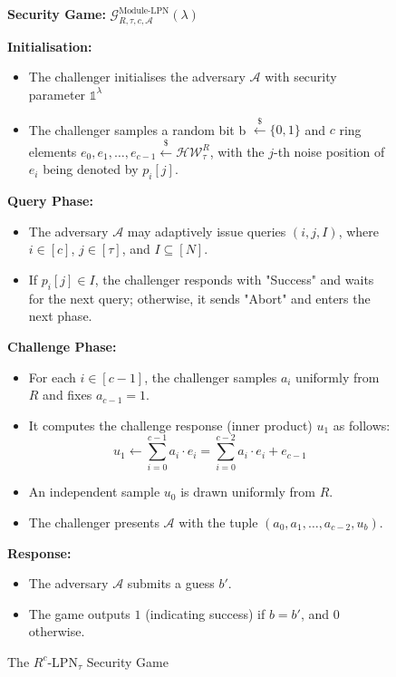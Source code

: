 \begin{figure}[t]
    \begin{mdframed}[]
        \begin{center}
            \textbf{Security Game:} $\mathcal{G}_{R, \tau, c,\mathcal{A}}^{\text{Module-LPN}}(\lambda)$\\
        \end{center}

        \textbf{Initialisation:}
        \begin{itemize}
            \item The challenger initialises the adversary $\mathcal{A}$ with security parameter $\mathds{1}^{\lambda}$
            \item The challenger samples a random bit b $\stackrel{\$}{\leftarrow} \{0,1\}$ and $c$ ring elements $e_{0}, e_{1}, \ldots, e_{c-1} \stackrel{\$}{\leftarrow} \mathcal{H} \mathcal{W}_{\tau}^{R}$, with the $j$-th noise position of $e_i$ being denoted by $p_{i}[j]$.
        \end{itemize}
        
        \textbf{Query Phase:}
        \begin{itemize}
            \item The adversary $\mathcal{A}$ may adaptively issue queries $(i, j, I)$, where $i \in [c]$, $j \in [\tau]$, and $I \subseteq [N]$.
            \item If $p_{i}[j] \in I$, the challenger responds with "Success" and waits for the next query; otherwise, it sends "Abort" and enters the next phase.
        \end{itemize}

        \textbf{Challenge Phase:}
        \begin{itemize}
            \item For each $i \in [c-1]$, the challenger samples $a_{i}$ uniformly from $R$ and fixes $a_{c-1} = 1$.
            \item It computes the challenge response (inner product) $u_{1}$ as follows:
            $$
            u_{1} \leftarrow \sum_{i=0}^{c-1} a_{i} \cdot e_{i} = \sum_{i=0}^{c-2} a_{i} \cdot e_{i} + e_{c-1}
            $$
            \item An independent sample $u_{0}$ is drawn uniformly from $R$.
            \item The challenger presents $\mathcal{A}$ with the tuple $\left(a_{0}, a_{1}, \ldots, a_{c-2}, u_{b}\right)$.
        \end{itemize}

        \textbf{Response:}
        \begin{itemize}
            \item The adversary $\mathcal{A}$ submits a guess $b'$.
            \item The game outputs $1$ (indicating success) if $b = b'$, and $0$ otherwise.
        \end{itemize}
    \end{mdframed}
    \caption{The $R^{c}$-LPN$_{\tau}$ Security Game}
    \label{fig:module-lpn-game}
\end{figure}

